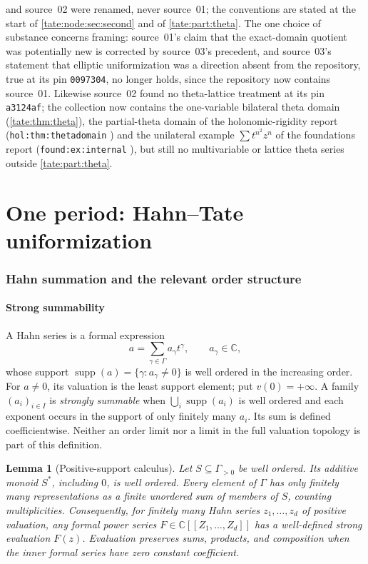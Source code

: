 \documentclass[11pt,letterpaper]{article}
\newtheorem{lemma}[lemma]{Lemma}
\theoremstyle{definition}
\newcommand{\C}{\mathbb C}
\newcommand{\supp}{\operatorname{supp}}
\begin{document}
and source~02 were renamed, never source~01; the conventions are stated at the
start of \cref{tate:node:sec:second} and of \cref{tate:part:theta}. The one
choice of substance concerns framing: source~01's claim that the
exact-domain quotient was potentially new is corrected by source~03's
precedent, and source~03's statement that elliptic uniformization was a
direction absent from the repository, true at its pin \texttt{0097304},
no longer holds, since the repository now contains source~01. Likewise
source~02 found no theta-lattice treatment at its pin \texttt{a3124af}; the
collection now
contains the one-variable bilateral theta domain (\cref{tate:thm:theta}),
the partial-theta domain of the holonomic-rigidity report
(\texttt{hol:thm:thetadomain} \cite{RepoHol}) and the unilateral example
$\sum t^{n^2}z^n$ of the foundations report (\texttt{found:ex:internal}
\cite{RepoFoundations}), but still no multivariable or lattice theta series
outside \cref{tate:part:theta}.

\part{One period: Hahn--Tate uniformization}\label{tate:part:uniformization}

\section{Hahn summation and the relevant order structure}\label{tate:sec:hahn}

\subsection{Strong summability}

A Hahn series is a formal expression
\[
 a=\sum_{\gamma\in\Gamma}a_\gamma t^\gamma,
 \qquad a_\gamma\in\C,
\]
whose support $\supp(a)=\{\gamma:a_\gamma\ne0\}$ is well ordered in the
increasing order. For $a\ne0$, its valuation is the least support element; put $v(0)=+\infty$.
A family $(a_i)_{i\in I}$ is \emph{strongly summable} when
$\bigcup_i\supp(a_i)$ is well ordered and each exponent occurs in the
support of only finitely many $a_i$. Its sum is defined coefficientwise.
Neither an order limit nor a limit in the full valuation topology is part
of this definition.

\begin{lemma}[Positive-support calculus]\label{tate:lem:neumann}
Let $S\subseteq\Gamma_{>0}$ be well ordered. Its additive monoid $S^*$,
including $0$, is well ordered. Every element of $\Gamma$ has only
finitely many representations as a finite unordered sum of members of
$S$, counting multiplicities. Consequently, for finitely many Hahn
series $z_1,\dots,z_d$ of positive valuation, any formal power series
$F\in\C[[Z_1,\dots,Z_d]]$ has a well-defined strong evaluation $F(z)$.
Evaluation preserves sums, products, and composition when the inner
formal series have zero constant coefficient.
\end{lemma}
\end{document}
